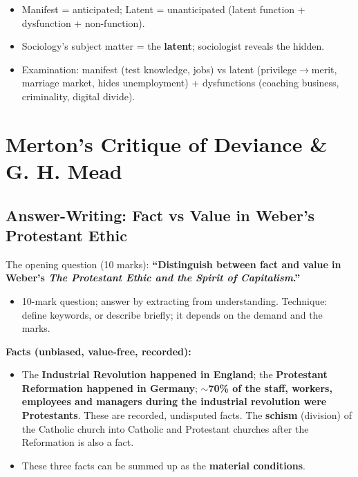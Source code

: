 \begin{QuickRevision}
\begin{itemize}
\item Manifest = anticipated; Latent = unanticipated (latent function + dysfunction + non-function).
\item Sociology's subject matter = the \textbf{latent}; sociologist reveals the hidden.
\item Examination: manifest (test knowledge, jobs) vs latent (privilege$\rightarrow$merit, marriage market, hides unemployment) + dysfunctions (coaching business, criminality, digital divide).
\end{itemize}
\end{QuickRevision}

\sectiondivider

\section{Merton's Critique of Deviance \& G. H. Mead}

\subsection{Answer-Writing: Fact vs Value in Weber's Protestant Ethic}

The opening question (10 marks): \textbf{``Distinguish between fact and value in Weber's \textit{The Protestant Ethic and the Spirit of Capitalism}.''}

\begin{PYQLink}
\begin{itemize}
\item 10-mark question; answer by extracting from understanding. Technique: define keywords, or describe briefly; it depends on the demand and the marks.
\end{itemize}
\end{PYQLink}

\begin{DataFact}
\textbf{Facts (unbiased, value-free, recorded):}
\begin{itemize}
\item The \textbf{Industrial Revolution happened in England}; the \textbf{Protestant Reformation happened in Germany}; \textbf{$\sim$70\% of the staff, workers, employees and managers during the industrial revolution were Protestants}. These are recorded, undisputed facts. The \textbf{schism} (division) of the Catholic church into Catholic and Protestant churches after the Reformation is also a fact.
\item These three facts can be summed up as the \textbf{material conditions}.
\end{itemize}
\end{DataFact}

